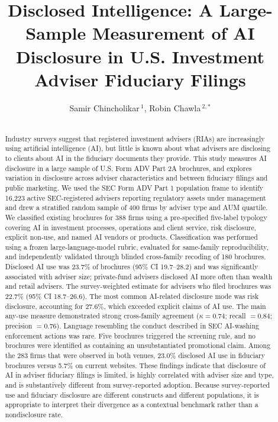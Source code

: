 \documentclass[utf8]{FrontiersinHarvard}
\def\firstAuthorLast{Chincholikar {and} Chawla}
\def\Authors{Samir Chincholikar\,$^{1}$, Robin Chawla\,$^{2,*}$}
\begin{document}
\onecolumn
{}

\title[Disclosed Intelligence]{Disclosed Intelligence: A Large-Sample Measurement of AI Disclosure in U.S. Investment Adviser Fiduciary Filings}

\author[\firstAuthorLast ]{\Authors}
\address{}
\correspondance{}
\extraAuth{}

\maketitle

\begin{abstract}
\section{}
Industry surveys suggest that registered investment advisers (RIAs) are increasingly using artificial intelligence (AI), but little is known about what advisers are disclosing to clients about AI in the fiduciary documents they provide. This study measures AI disclosure in a large sample of U.S. Form ADV Part 2A brochures, and explores variation in disclosure across adviser characteristics and between fiduciary filings and public marketing. We used the SEC Form ADV Part 1 population frame to identify 16{,}223 active SEC-registered advisers reporting regulatory assets under management and drew a stratified random sample of 400 firms by adviser type and AUM quartile. We classified existing brochures for 388 firms using a pre-specified five-label typology covering AI in investment processes, operations and client service, risk disclosure, explicit non-use, and named AI vendors or products. Classification was performed using a frozen large-language-model rubric, evaluated for same-family reproducibility, and independently validated through blinded cross-family recoding of 180 brochures. Disclosed AI use was 23.7\% of brochures (95\% CI 19.7--28.2) and was significantly associated with adviser size; private-fund advisers disclosed AI more often than wealth and retail advisers. The survey-weighted estimate for advisers who filed brochures was 22.7\% (95\% CI 18.7--26.6). The most common AI-related disclosure mode was risk disclosure, accounting for 27.6\%, which exceeded explicit claims of AI use. The main any-use measure demonstrated strong cross-family agreement ($\kappa = 0.74$; recall $= 0.84$; precision $= 0.76$). Language resembling the conduct described in SEC AI-washing enforcement actions was rare. Five brochures triggered the screening rule, and no brochures were identified as containing an unsubstantiated promotional claim. Among the 283 firms that were observed in both venues, 23.0\% disclosed AI use in fiduciary brochures versus 5.7\% on current websites. These findings indicate that disclosure of AI in adviser fiduciary filings is limited, is highly correlated with adviser size and type, and is substantively different from survey-reported adoption. Because survey-reported use and fiduciary disclosure are different constructs and different populations, it is appropriate to interpret their divergence as a contextual benchmark rather than a nondisclosure rate.


\end{abstract}
\end{document}
